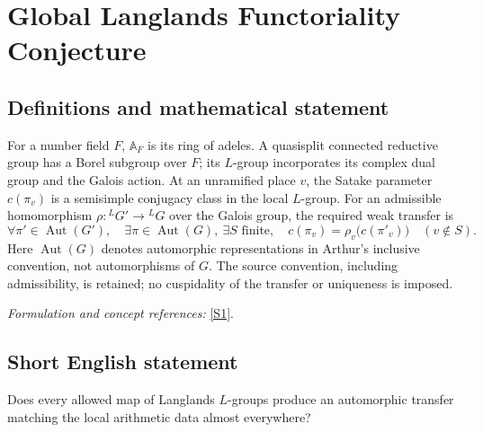 \documentclass[11pt,a4paper]{article}
\newcommand{\A}{\mathbb{A}}
\newcommand{\sref}[2]{\hyperlink{source:#1:#2}{[S#2]}}
\newif\ifshowcatalogue
\newcommand{\cataloguescope}[1]{\ifshowcatalogue
 \paragraph{Exact scope in the supplied catalogue.}
 \begin{quote}\small #1\end{quote}\fi}
\begin{document}
\setcounter{section}{0}
\clearpage
\section*{\texorpdfstring{Global Langlands Functoriality Conjecture}{Global Langlands Functoriality Conjecture}}\label{statement}
\subsection{Definitions and mathematical statement}
For a number field $F$, $\A_F$ is its ring of adeles. A quasisplit connected reductive group has a Borel subgroup over $F$; its $L$-group incorporates its complex dual group and the Galois action. At an unramified place $v$, the Satake parameter $c(\pi_v)$ is a semisimple conjugacy class in the local $L$-group. For an admissible homomorphism $\rho:{}^LG'\to{}^LG$ over the Galois group, the required weak transfer is
\[
 \forall\pi'\in\operatorname{Aut}(G'),\quad \exists\pi\in\operatorname{Aut}(G),\ \exists S\text{ finite},\quad
 c(\pi_v)=\rho_v\bigl(c(\pi'_v)\bigr)\quad(v\notin S).
\]
Here $\operatorname{Aut}(G)$ denotes automorphic representations in Arthur's inclusive convention, not automorphisms of $G$. The source convention, including admissibility, is retained; no cuspidality of the transfer or uniqueness is imposed.
\par\smallskip\textit{Formulation and concept references:} \sref{statement}{1}.
\cataloguescope{For every number field F, quasisplit connected reductive F-groups G-prime and G, and admissible L-homomorphism rho:L(G-prime)->L(G) (over Gamma\_F, commuting with its projections, in Arthur Principle1.1's convention), every automorphic representation pi-prime of G-prime(A\_F), in the inclusive Langlands sense cited there, has an automorphic representation pi of G(A\_F) whose unramified Satake classes equal the images under rho\_v of those of pi-prime outside a finite set of places. This is existence of a weak transfer, not uniqueness or a prescribed transfer function.}
\subsection{Short English statement}
Does every allowed map of Langlands $L$-groups produce an automorphic transfer matching the local arithmetic data almost everywhere?
\end{document}
